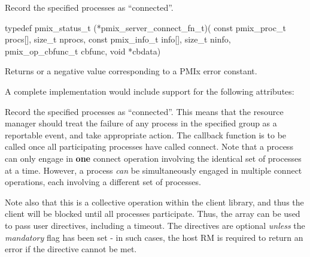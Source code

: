 \summary

Record the specified processes as ``connected''.

\format

\cspecificstart
\begin{codepar}
typedef pmix_status_t (*pmix_server_connect_fn_t)(
                             const pmix_proc_t procs[], size_t nprocs,
                             const pmix_info_t info[], size_t ninfo,
                             pmix_op_cbfunc_t cbfunc, void *cbdata)
\end{codepar}
\cspecificend

\begin{arglist}
\end{arglist}

Returns  or a negative value corresponding to a PMIx error constant.

\optattr
A complete implementation would include support for the following attributes:


\descr

Record the specified processes as ``connected''.
This means that the resource manager should treat the failure of any process in the specified group as a reportable event, and take appropriate action.
The callback function is to be called once all participating processes have called connect.
Note that a process can only engage in \textbf{one} connect operation involving the identical set of processes at a time.
However, a process \emph{can} be simultaneously engaged in multiple connect operations, each involving a different set of processes.

Note also that this is a collective operation within the client library, and thus the client will be blocked until all processes participate.
Thus, the  array can be used to pass user directives, including a timeout.
The directives are optional \emph{unless} the \emph{mandatory} flag has been set - in such cases, the host RM is required to return an error if the directive cannot be met.


